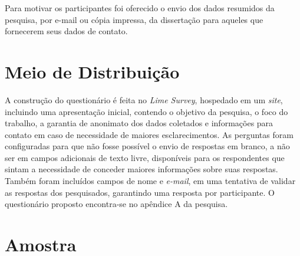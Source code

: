 \indent Para motivar os participantes foi oferecido o envio dos dados resumidos da pesquisa, por e-mail ou cópia impressa, da dissertação para aqueles que fornecerem seus dados de contato.

\section{Meio de Distribuição} \label{Meio de Distribuição}

A construção do questionário é feita no \textit{Lime Survey}, hospedado em um \textit{site}, incluindo uma apresentação inicial, contendo o objetivo da pesquisa, o foco do trabalho, a garantia de anonimato dos dados coletados e informações para contato em caso de necessidade de maiores esclarecimentos. As perguntas foram configuradas para que não fosse possível o envio de respostas em branco, a não ser em campos adicionais de texto livre, disponíveis para os respondentes que sintam a necessidade de conceder maiores informações sobre suas respostas.\newline
\indent Também foram incluídos campos de nome e \textit{e-mail}, em uma tentativa de validar as respostas dos pesquisados, garantindo uma resposta por participante. O questionário proposto encontra-se no apêndice A da pesquisa.\newline

\section{Amostra} \label{Amostra}

